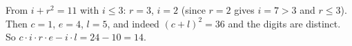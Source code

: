 From $i+r^2=11$ with $i\le3$: $r=3$, $i=2$ (since $r=2$ gives $i=7>3$ and $r\le3$). Then $c=1$, $e=4$, $l=5$, and indeed $(c+l)^2=36$ and the digits are distinct. So $c\cdot i\cdot r\cdot e-i\cdot l=24-10=\boxed{14}$.
